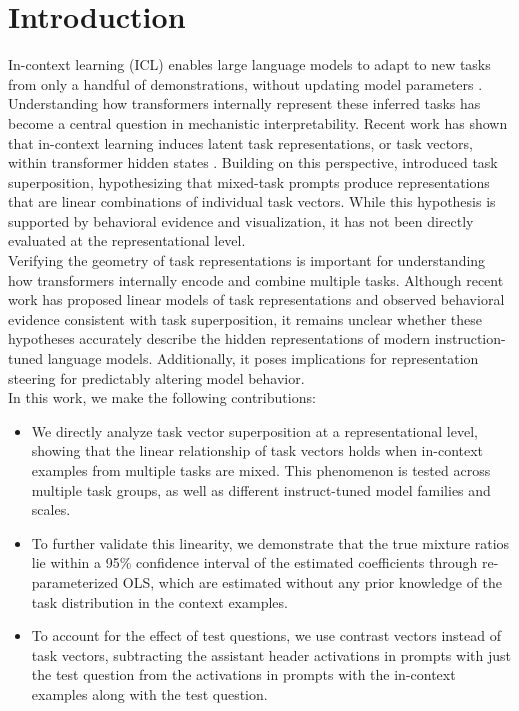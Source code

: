 \documentclass[11pt]{article}
\begin{document}
\section{Introduction}
In-context learning (ICL) enables large language models to adapt to new tasks from only a handful of demonstrations, without updating model parameters \citep{brown2020language}. Understanding how transformers internally represent these inferred tasks has become a central question in mechanistic interpretability. Recent work has shown that in-context learning induces latent task representations, or task vectors, within transformer hidden states \citep{Hendel2023-yk, Dong2025-jo}. Building on this perspective, \citet{xiong2024oncellmsincontextlearn} introduced task superposition, hypothesizing that mixed-task prompts produce representations that are linear combinations of individual task vectors. While this hypothesis is supported by behavioral evidence and visualization, it has not been directly evaluated at the representational level.\\[1em]
Verifying the geometry of task representations is important for understanding how transformers internally encode and combine multiple tasks. Although recent work has proposed linear models of task representations and observed behavioral evidence consistent with task superposition, it remains unclear whether these hypotheses accurately describe the hidden representations of modern instruction-tuned language models. Additionally, it poses implications for representation steering for predictably altering model behavior. \\[1em]
In this work, we make the following contributions:
\begin{itemize}
    \item We directly analyze task vector superposition at a representational level, showing that the linear relationship of task vectors holds when in-context examples from multiple tasks are mixed. This phenomenon is tested across multiple task groups, as well as different instruct-tuned model families and scales.
        \item To further validate this linearity, we demonstrate that the true mixture ratios lie within a 95\% confidence interval of the estimated coefficients through re-parameterized OLS, which are estimated without any prior knowledge of the task distribution in the context examples.
    \item To account for the effect of test questions, we use contrast vectors instead of task vectors, subtracting the assistant header activations in prompts with just the test question from the activations in prompts with the in-context examples along with the test question.
\end{itemize}
\end{document}
